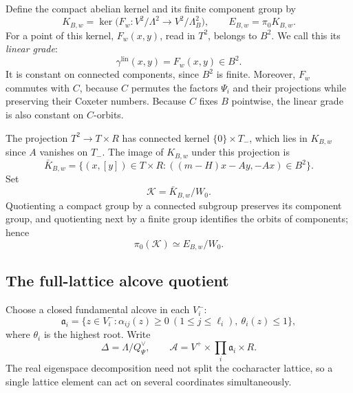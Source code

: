 \documentclass[11pt,a4paper,reqno]{amsart}
\theoremstyle{plain}
\theoremstyle{definition}
\theoremstyle{remark}
\numberwithin{equation}{section}
\newcommand{\fa}{\mathfrak a}
\begin{document}
Define the compact abelian kernel and its finite component group by
\begin{equation}\label{eq:kernel}
K_{B,w}=\ker\bigl(F_w\colon V^2/\Lambda^2\longrightarrow V^2/\Lambda_B^2\bigr), \qquad E_{B,w}=\pi_0K_{B,w}.
\end{equation}
For a point of this kernel, $F_w(x,y)$, read in $T^2$, belongs to $B^2$. We call this its \emph{linear grade}:
\begin{equation}\label{eq:lineargrade}
\gamma^{\mathrm{lin}}(x,y)=F_w(x,y)\in B^2.
\end{equation}
It is constant on connected components, since $B^2$ is finite. Moreover, $F_w$ commutes with $C$, because $C$ permutes the factors $\Psi_i$ and their projections while preserving their Coxeter numbers. Because $C$ fixes $B$ pointwise, the linear grade is also constant on $C$-orbits.

The projection $T^2\to T\times R$ has connected kernel $\{0\}\times T_-$, which lies in $K_{B,w}$ since $A$ vanishes on $T_-$. The image of $K_{B,w}$ under this projection is
\[
\bar K_{B,w}=\{(x,[y])\in T\times R:((m-H)x-Ay,-Ax)\in B^2\}.
\]
Set
\[
\mathcal K=\bar K_{B,w}/W_0.
\]
Quotienting a compact group by a connected subgroup preserves its component group, and quotienting next by a finite group identifies the orbits of components; hence
\begin{equation}\label{eq:components}
\pi_0(\mathcal K)\simeq E_{B,w}/W_0.
\end{equation}

\subsection{The full-lattice alcove quotient}

Choose a closed fundamental alcove in each $V_i^-$:
\[
\fa_i=\{z\in V_i^-:\alpha_{ij}(z)\ge0\ (1\le j\le\ell_i),\ \theta_i(z)\le1\},
\]
where $\theta_i$ is the highest root. Write
\[
\Delta=\Lambda/Q_\Psi^\vee,\qquad \mathcal A=V^+\times\prod_i\fa_i\times R.
\]
The real eigenspace decomposition need not split the cocharacter lattice, so a single lattice element can act on several coordinates simultaneously.
\end{document}
